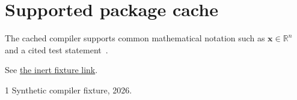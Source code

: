 \documentclass{article}
\begin{document}
\section{Supported package cache}
The cached compiler supports common mathematical notation such as
$\bm{x} \in \mathbb{R}^{n}$ and a cited test statement~\cite{fixture}.

See \href{https://example.invalid}{the inert fixture link}.
\begin{thebibliography}{1}
 Synthetic compiler fixture, 2026.
\end{thebibliography}
\end{document}
